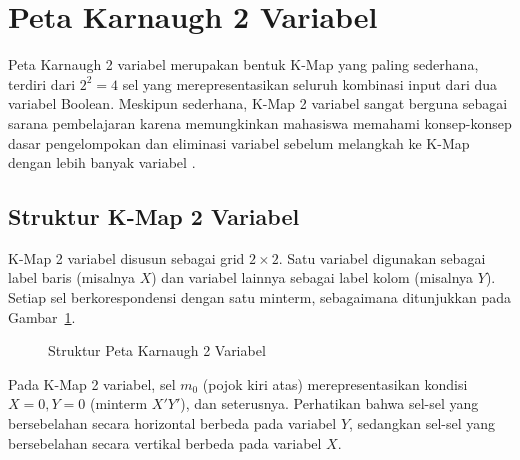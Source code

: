 \section{Peta Karnaugh 2 Variabel}

Peta Karnaugh 2 variabel merupakan bentuk K-Map yang paling sederhana, terdiri dari $2^2 = 4$ sel yang merepresentasikan seluruh kombinasi input dari dua variabel Boolean. Meskipun sederhana, K-Map 2 variabel sangat berguna sebagai sarana pembelajaran karena memungkinkan mahasiswa memahami konsep-konsep dasar pengelompokan dan eliminasi variabel sebelum melangkah ke K-Map dengan lebih banyak variabel \cite{rosen2019}.

\subsection{Struktur K-Map 2 Variabel}

K-Map 2 variabel disusun sebagai grid $2 \times 2$. Satu variabel digunakan sebagai label baris (misalnya $X$) dan variabel lainnya sebagai label kolom (misalnya $Y$). Setiap sel berkorespondensi dengan satu minterm, sebagaimana ditunjukkan pada Gambar~\ref{fig:kmap-2var}.

\begin{figure}[htbp]
\centering
{}
\caption{Struktur Peta Karnaugh 2 Variabel}
\label{fig:kmap-2var}
\end{figure}

Pada K-Map 2 variabel, sel $m_0$ (pojok kiri atas) merepresentasikan kondisi $X = 0, Y = 0$ (minterm $X'Y'$), dan seterusnya. Perhatikan bahwa sel-sel yang bersebelahan secara horizontal berbeda pada variabel $Y$, sedangkan sel-sel yang bersebelahan secara vertikal berbeda pada variabel $X$.

